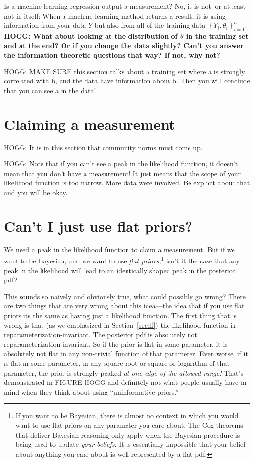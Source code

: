 \documentclass{article}
\newcommand{\sectionname}{Section}
\newcommand{\secref}[1]{\sectionname~\ref{#1}}
\newcommand{\setof}[1]{\left\{{#1}\right\}}
\begin{document}
Is a machine learning regression output a measurement?
No, it is not, or at least not in itself:
When a machine learning method returns a result, it is using information from your data $Y$
but also from all of the training data $\setof{Y_i, \theta_i}_{i=1}^n$.
\textbf{HOGG: What about looking at the distribution of $\theta$ in the training set and at the end? Or if you change the data slightly? Can't you answer the information theoretic questions that way? If not, why not?}

HOGG: MAKE SURE this section talks about a training set where a is strongly correlated with b, and the data have information about b. Then you will conclude that you can see a in the data!

\section{Claiming a measurement}\label{sec:claim}

HOGG: It is in this section that community norms must come up.

HOGG: Note that if you can't see a peak in the likelihood function, it doesn't mean that you don't have a measurement! It just means that the scope of your likelihood function is too narrow. More data were involved. Be explicit about that and you will be okay.

\section{Can't I just use flat priors?}\label{sec:flat}
We need a peak in the likelihood function to claim a measurement.
But if we want to be Bayesian, and we want to use \emph{flat priors},\footnote{%
If you want to be Bayesian, there is almost no context in which you would want to use flat priors on any parameter you care about.
The Cox theorems that deliver Bayesian reasoning only apply when the Bayesian procedure is being used to update \emph{your beliefs}.
It is essentially impossible that your belief about anything you care about is well represented by a flat pdf.}
isn't it the case that any peak in the likelihood will lead to an identically shaped peak in the posterior pdf?

This sounds so naively and obviously true, what could possibly go wrong?
There are two things that are very wrong about this idea---the idea that if you use flat priors its the same as having just a likelihood function.
The first thing that is wrong is that (as we emphasized in \secref{sec:lf}) the likelihood function in reparameterization-invariant.
The posterior pdf is absolutely not reparameterization-invariant.
So if the prior is flat in some parameter, it is absolutely not flat in any non-trivial function of that parameter.
Even worse, if it is flat in some parameter, in any square-root or square or logarithm of that parameter, the prior is strongly peaked \emph{at one edge of the allowed range!}
That's demonstrated in FIGURE HOGG and definitely not what people usually have in mind when they think about using ``uninformative priors.''
\end{document}
